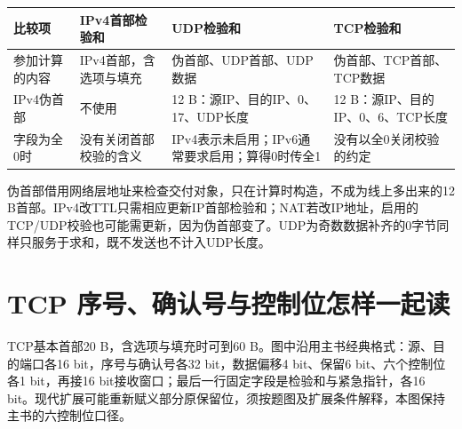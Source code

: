 \begin{wideblock}

\par\medskip\noindent\begin{minipage}{\linewidth}\fontsize{9.3}{12}\selectfont\begin{tabularx}{\linewidth}{@{}YYYY@{}}
\toprule\noalign{}
\begin{minipage}[b]{\linewidth}\raggedright
比较项
\end{minipage} & \begin{minipage}[b]{\linewidth}\raggedright
IPv4首部检验和
\end{minipage} & \begin{minipage}[b]{\linewidth}\raggedright
UDP检验和
\end{minipage} & \begin{minipage}[b]{\linewidth}\raggedright
TCP检验和
\end{minipage} \\
\midrule\noalign{}


参加计算的内容 & IPv4首部，含选项与填充 & 伪首部、UDP首部、UDP数据 & 伪首部、TCP首部、TCP数据 \\
IPv4伪首部 & 不使用 & 12 B：源IP、目的IP、0、17、UDP长度 & 12 B：源IP、目的IP、0、6、TCP长度 \\
字段为全0时 & 没有关闭首部校验的含义 & IPv4表示未启用；IPv6通常要求启用；算得0时传全1 & 没有以全0关闭校验的约定 \\
\bottomrule\end{tabularx}
\end{minipage}\par\medskip

\end{wideblock}

伪首部借用网络层地址来检查交付对象，只在计算时构造，不成为线上多出来的12 B首部。IPv4改TTL只需相应更新IP首部检验和；NAT若改IP地址，启用的TCP/UDP校验也可能需更新，因为伪首部变了。UDP为奇数数据补齐的0字节同样只服务于求和，既不发送也不计入UDP长度。

\section{TCP 序号、确认号与控制位怎样一起读}\label{CN05-04}

TCP基本首部20 B，含选项与填充时可到60 B。图中沿用主书经典格式：源、目的端口各16 bit，序号与确认号各32 bit，数据偏移4 bit、保留6 bit、六个控制位各1 bit，再接16 bit接收窗口；最后一行固定字段是检验和与紧急指针，各16 bit。现代扩展可能重新赋义部分原保留位，须按题图及扩展条件解释，本图保持主书的六控制位口径。

